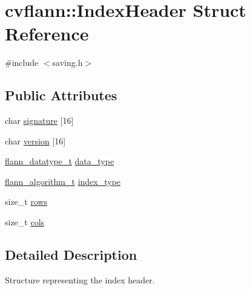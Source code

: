 \hypertarget{structcvflann_1_1IndexHeader}{\section{cvflann\-:\-:Index\-Header Struct Reference}
\label{structcvflann_1_1IndexHeader}
}


{\ttfamily \#include $<$saving.\-h$>$}

\subsection*{Public Attributes}
\begin{DoxyCompactItemize}
\item 
char \hyperlink{structcvflann_1_1IndexHeader_a03d7179b97511bb054a8f3b48f0bb665}{signature} \mbox{[}16\mbox{]}
\item 
char \hyperlink{structcvflann_1_1IndexHeader_ae7913274085c6b7bd9e5e2ac3c833426}{version} \mbox{[}16\mbox{]}
\item 
\hyperlink{namespacecvflann_a88c00eb61998ec9fcfba6f9db2987fdb}{flann\-\_\-datatype\-\_\-t} \hyperlink{structcvflann_1_1IndexHeader_ad58bffdf6cf33b8db57979761aadaea7}{data\-\_\-type}
\item 
\hyperlink{namespacecvflann_a4e3e6c98d774ea77fd7f0045c9bc7817}{flann\-\_\-algorithm\-\_\-t} \hyperlink{structcvflann_1_1IndexHeader_a96a0beb8878a169ce205c235e6297a27}{index\-\_\-type}
\item 
size\-\_\-t \hyperlink{structcvflann_1_1IndexHeader_a28681806ee8208d07e3cd52e8d37d979}{rows}
\item 
size\-\_\-t \hyperlink{structcvflann_1_1IndexHeader_aa4affadae6f976062fd433de69d4cdca}{cols}
\end{DoxyCompactItemize}


\subsection{Detailed Description}
Structure representing the index header. 

